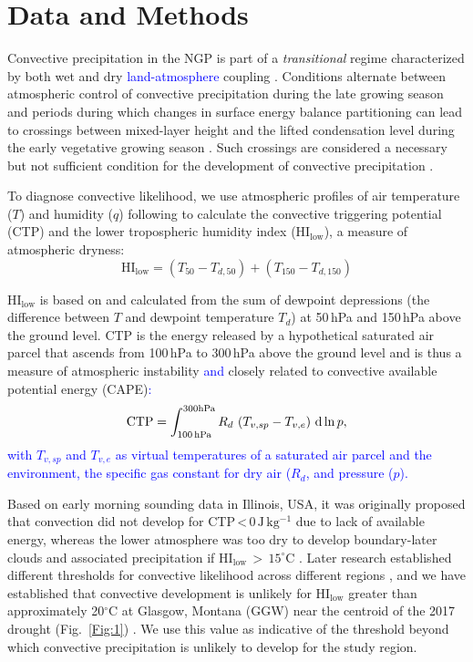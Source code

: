\documentclass[hess, manuscript]{copernicus}
\def\TG{\textcolor{blue}}
\begin{document}
\section{Data and Methods}
Convective precipitation in the NGP is part of a \emph{transitional} regime characterized by both wet and dry \TG{land-atmosphere} coupling \citep{Findell_2003b}. Conditions alternate between atmospheric control of convective precipitation during the late growing season and periods during which changes in surface energy balance partitioning can lead to crossings between mixed-layer height and the lifted condensation level during the early vegetative growing season \citep{Gerken_2018}. Such crossings are considered a necessary but not sufficient condition for the development of convective precipitation \citep{Juang_2007a, Juang_2007b}.

To diagnose convective likelihood, we use atmospheric profiles of air temperature ($T$) and humidity ($q$) following \citep{Findell_2003a, Findell_2003b} to calculate the convective triggering potential (CTP) and the lower tropospheric humidity index ($\mathrm{HI_{low}}$), a measure of atmospheric dryness:
%
\begin{equation}
\mathrm{HI_{low}} = \left( T_{50} - T_{d,50} \right) + \left( T_{150} - T_{d,150} \right)
\end{equation}

$\mathrm{HI_{low}}$ is based on \citet{Lytinska_1976} and calculated from the sum of dewpoint depressions (the difference between $T$ and dewpoint temperature $T_d$) at 50\,hPa and 150\,hPa above the ground level. CTP is the energy released by a hypothetical saturated air parcel that ascends from 100\,hPa to 300\,hPa above the ground level and is thus a measure of atmospheric instability \citep{Findell_2003a, Findell_2003b} \TG{and} closely related to convective available potential energy (CAPE)\TG{: 
%
\begin{equation}
\mathrm{CTP} = \int_{100\,{\rm hPa}}^{300{\rm hPa}} R_d\,\left(T_{v,sp}-T_{v,e}\right)\,\mathrm{d\,ln}\,p,
\end{equation}
with $T_{v,sp}$ and $T_{v,e}$ as virtual temperatures of a saturated air parcel and the environment, the specific gas constant for dry air ($R_d$, and pressure ($p$).} 

Based on early morning sounding data in Illinois, USA, it was originally proposed that convection did not develop for CTP\,<\,0\,$\mathrm{J\,kg^{-1}}$ due to lack of available energy, whereas the lower atmosphere was too dry to develop boundary-later clouds and associated precipitation if $\mathrm{HI_{low}\,>\,15^\circ C}$ \citep{Findell_2003a, Findell_2003b}. Later research established different thresholds for convective likelihood across different regions \citep{Ferguson_2011, Roundy_2012}, and we have established that convective development is unlikely for $\mathrm{HI_{low}}$  greater than approximately 20$\mathrm{^\circ}$C at Glasgow, Montana (GGW) near the centroid of the 2017 drought (Fig.~\ref{Fig:1}) \citep{Gerken_2018}. We use this value as indicative of the threshold beyond which convective precipitation is unlikely to develop for the study region.
\end{document}
